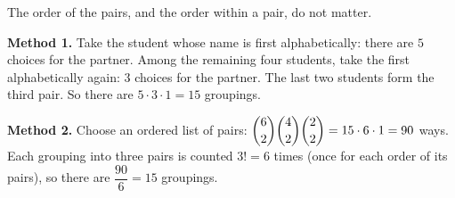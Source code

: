 The order of the pairs, and the order within a pair, do not matter.

\textbf{Method 1.} Take the student whose name is first alphabetically: there are $5$ choices for the partner. Among the remaining four students, take the first alphabetically again: $3$ choices for the partner. The last two students form the third pair. So there are $5\cdot3\cdot1=\boxed{15}$ groupings.

\textbf{Method 2.} Choose an ordered list of pairs: $\dbinom62\dbinom42\dbinom22=15\cdot6\cdot1=90$ ways. Each grouping into three pairs is counted $3!=6$ times (once for each order of its pairs), so there are $\dfrac{90}{6}=15$ groupings.
